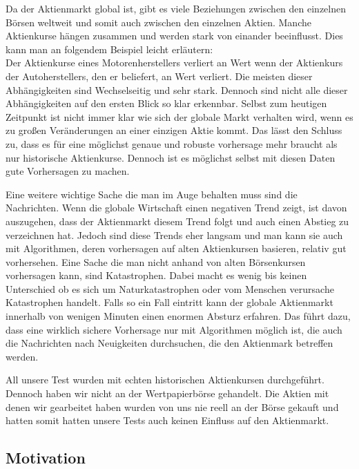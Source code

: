 \documentclass[12pt]{article} %
\begin{document}
Da der Aktienmarkt global ist, gibt es viele Beziehungen zwischen den einzelnen Börsen weltweit und somit auch zwischen den einzelnen Aktien. Manche Aktienkurse hängen zusammen und werden stark von einander beeinflusst. Dies kann man an folgendem Beispiel leicht erläutern:\\
Der Aktienkurse eines Motorenherstellers verliert an Wert wenn der Aktienkurs der Autoherstellers, den er beliefert, an Wert verliert. Die meisten dieser Abhängigkeiten sind Wechselseitig und sehr stark. Dennoch sind nicht alle dieser Abhängigkeiten auf den ersten Blick so klar erkennbar. Selbst zum heutigen Zeitpunkt ist nicht immer klar wie sich der globale Markt verhalten wird, wenn es zu großen Veränderungen an einer einzigen Aktie kommt. Das lässt den Schluss zu, dass es für eine möglichst genaue und robuste vorhersage mehr braucht als nur historische Aktienkurse. Dennoch ist es möglichst selbst mit diesen Daten gute Vorhersagen zu machen.  

Eine weitere wichtige Sache die man im Auge behalten muss sind die Nachrichten. Wenn die globale Wirtschaft einen negativen Trend zeigt, ist davon auszugehen, dass der Aktienmarkt diesem Trend folgt und auch einen Abstieg zu verzeichnen hat. Jedoch sind diese Trends eher langsam und man kann sie auch mit Algorithmen, deren vorhersagen auf alten Aktienkursen basieren, relativ gut vorhersehen. Eine Sache die man nicht anhand von alten Börsenkursen vorhersagen kann, sind Katastrophen. Dabei macht es wenig bis keinen Unterschied ob es sich um Naturkatastrophen oder vom Menschen verursache Katastrophen handelt. Falls so ein Fall eintritt kann der globale Aktienmarkt innerhalb von wenigen Minuten einen enormen Absturz erfahren. Das führt dazu, dass eine wirklich sichere Vorhersage nur mit Algorithmen möglich ist, die auch die Nachrichten nach Neuigkeiten durchsuchen, die den Aktienmark betreffen werden.

All unsere Test wurden mit echten historischen Aktienkursen durchgeführt. Dennoch haben wir nicht an der Wertpapierbörse gehandelt. Die Aktien mit denen wir gearbeitet haben wurden von uns nie reell an der Börse gekauft und hatten somit hatten unsere Tests auch keinen Einfluss auf den Aktienmarkt. 

\subsection{Motivation}
\end{document}
